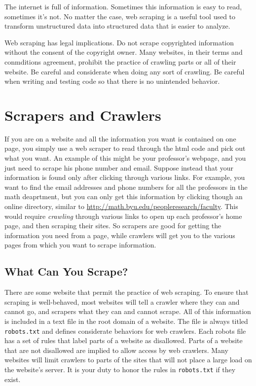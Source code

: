 \label{lab:Advanced_BS}

The internet is full of information.
Sometimes this information is easy to read, sometimes it's not.
No matter the case, web scraping is a useful tool used to transform unstructured data into structured data that is easier to analyze.

\begin{warn}
Web scraping has legal implications.
Do not scrape copyrighted information without the consent of the copyright owner.
Many websites, in their terms and conmditions agreement, prohibit the practice of crawling parts or all of their website.
Be careful and considerate when doing any sort of crawling.
Be careful when writing and testing code so that there is no unintended behavior.
\end{warn}

\section*{Scrapers and Crawlers}
If you are on a website and all the information you want is contained on one page, you simply use a web scraper to read through the html code and pick out what you want.
An example of this might be your professor's webpage, and you just need to scrape his phone number and email.
Suppose instead that your information is found only after clicking through various links.
For example, you want to find the email addresses and phone numbers for all the professors in the math deaprtment, but you can only get this information by clicking though an online directory, similar to \url{http://math.byu.edu/peopleresearch/faculty}.
This would require \textit{crawling} through various links to open up each professor's home page, and then scraping their sites.
So scrapers are good for getting the information you need from a page, while crawlers will get you to the various pages from which you want to scrape information.

\subsection*{What Can You Scrape?}
There are some website that permit the practice of web scraping.
To ensure that scraping is well-behaved, most websites will tell a crawler where they can and cannot go, and scrapers what they can and cannot scrape.
All of this information is included in a text file in the root domain of a website.
The file is always titled \texttt{robots.txt} and defines considerate behaviors for web crawlers.
Each robots file has a set of rules that label parts of a website as disallowed.
Parts of a website that are not disallowed are implied to allow access by web crawlers.
Many websites will limit crawlers to parts of the sites that will not place a large load on the 
website's server.
It is your duty to honor the rules in \texttt{robots.txt} if they exist.

